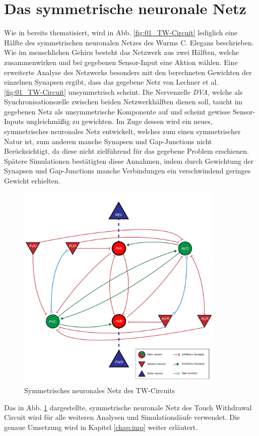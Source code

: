 \section{Das symmetrische neuronale Netz}
\label{sec:my_net}
	Wie in \cite{Wicks1996} bereits thematisiert, wird in Abb. \ref{fig:01_TW-Circuit} lediglich eine Hälfte des symmetrischen neuronalen Netzes des Wurms C. Elegans beschrieben. Wie im menschlichen Gehirn besteht das Netzwerk aus zwei Hälften, welche zusammenwirken und bei gegebenen Sensor-Input eine Aktion wählen. Eine erweiterte Analyse des Netzwerks besonders mit den berechneten Gewichten der einzelnen Synapsen ergibt, dass das gegebene Netz von Lechner et al. \ref{fig:01_TW-Circuit} unsymmetrisch scheint. Die Nervenzelle \textit{DVA}, welche als Synchronisationszelle zwischen beiden Netzwerkhälften dienen soll, taucht im gegebenen Netz als unsymmetrische Komponente auf und scheint gewisse Sensor-Inputs ungleichmäßig zu gewichten. Im Zuge dessen wird ein neues, symmetrisches neuronales Netz entwickelt, welches zum einen symmetrischer Natur ist, zum anderen manche Synapsen und Gap-Junctions nicht Berücksichtigt, da diese nicht zielführend für das gegebene Problem erschienen. Spätere Simulationen bestätigten diese Annahmen, indem durch Gewichtung der Synapsen und Gap-Junctions manche Verbindungen ein verschwindend geringes Gewicht erhielten.
	\begin{figure}[H] %
		\centering
		\includegraphics[width=10cm]{figures/chap_neuron/Neural_Net_v3_plain.pdf}
		\caption{Symmetrisches neuronales Netz des TW-Circuits}
		\label{fig:nn_new}
	\end{figure}
	Das in Abb. \ref{fig:nn_new} dargestellte, symmetrische neuronale Netz des Touch Withdrawal Circuit wird für alle weiteren Analysen und Simulationsläufe verwendet. Die genaue Umsetzung wird in Kapitel \ref{chap:imp} weiter erläutert.
	

